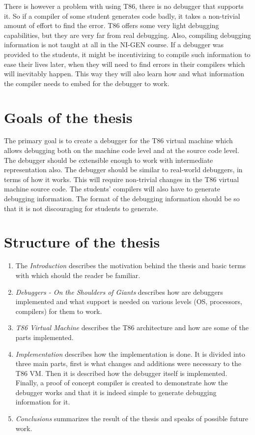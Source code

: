 There is however a problem with using T86, there is no debugger that supports
it. So if a compiler of some student generates code badly, it takes a
non-trivial amount of effort to find the error. T86 offers some very light
debugging capabilities, but they are very far from real debugging. Also,
compiling debugging information is not taught at all in the NI-GEN course. If a
debugger was provided to the students, it might be incentivizing to compile
such information to ease their lives later, when they will need to find errors
in their compilers which will inevitably happen. This way they will also learn
how and what information the compiler needs to embed for the debugger to work.

\section{Goals of the thesis}
The primary goal is to create a debugger for the T86 virtual machine which
allows debugging both on the machine code level and at the source code level.
The debugger should be extensible enough to work with intermediate
representation also. The debugger should be similar to real-world debuggers, in
terms of how it works. This will require non-trivial changes in the T86 virtual
machine source code. The students' compilers will also have to generate
debugging information. The format of the debugging information should be so
that it is not discouraging for students to generate.

\section{Structure of the thesis}
\begin{enumerate}
    \item The \textit{Introduction} describes the motivation behind the thesis
        and basic terms with which should the reader be familiar.
    \item \textit{Debuggers - On the Shoulders of Giants} describes how are
        debuggers implemented and what support is needed on various levels (OS,
        processors, compilers) for them to work.
    \item \textit{T86 Virtual Machine} describes the T86 architecture and how
        are some of the parts implemented.
    \item \textit{Implementation} describes how the implementation is done. It
        is divided into three main parts, first is what changes and additions
        were necessary to the T86 VM. Then it is described how the debugger
        itself is implemented. Finally, a proof of concept compiler is created
        to demonstrate how the debugger works and that it is indeed simple to
        generate debugging information for it.
    \item \textit{Conclusions} summarizes the result of the thesis and speaks
        of possible future work.
\end{enumerate}

